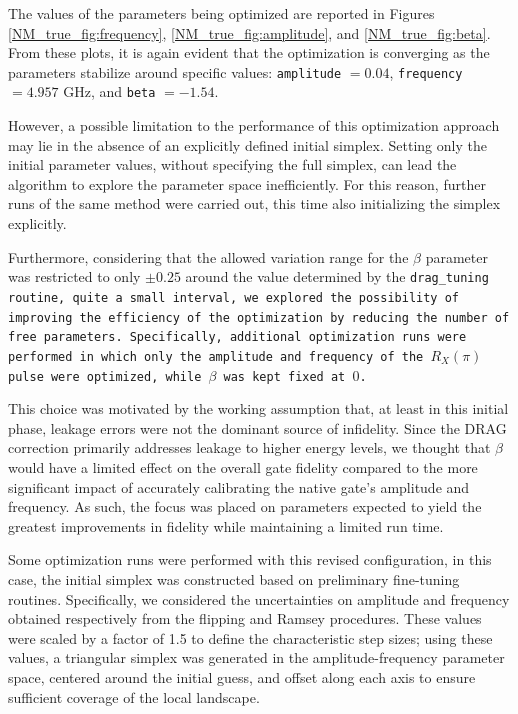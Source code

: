 The values of the parameters being optimized are reported in Figures \ref{NM_true_fig:frequency}, \ref{NM_true_fig:amplitude}, and \ref{NM_true_fig:beta}. 
From these plots, it is again evident that the optimization is converging as the parameters stabilize around specific values: \texttt{amplitude} $= 0.04$, \texttt{frequency} $= 4.957$ GHz, and \texttt{beta} $= -1.54$.

However, a possible limitation to the performance of this optimization approach may lie in the absence of an explicitly defined initial simplex.
Setting only the initial parameter values, without specifying the full simplex, can lead the algorithm to explore the parameter space inefficiently. 
For this reason, further runs of the same method were carried out, this time also initializing the simplex explicitly.

Furthermore, considering that the allowed variation range for the $\beta$ parameter was restricted to only $\pm0.25$ around the value determined by the \tt{drag\_tuning} routine, quite a small interval, we explored the possibility of improving the efficiency of the optimization by reducing the number of free parameters. 
Specifically, additional optimization runs were performed in which only the amplitude and frequency of the $R_X(\pi)$ pulse were optimized, while $\beta$ was kept fixed at $0$.

This choice was motivated by the working assumption that, at least in this initial phase, leakage errors were not the dominant source of infidelity. 
Since the DRAG correction primarily addresses leakage to higher energy levels, we thought that $\beta$ would have a limited effect on the overall gate fidelity compared to the more significant impact of accurately calibrating the native gate's amplitude and frequency. 
As such, the focus was placed on parameters expected to yield the greatest improvements in fidelity while maintaining a limited run time.

Some optimization runs were performed with this revised configuration, in this case, the initial simplex was constructed based on preliminary fine-tuning routines. 
Specifically, we considered the uncertainties on amplitude and frequency obtained respectively from the flipping and Ramsey procedures.
These values were scaled by a factor of 1.5 to define the characteristic step sizes; using these values, a triangular simplex was generated in the amplitude-frequency parameter space, centered around the initial guess, and offset along each axis to ensure sufficient coverage of the local landscape.

